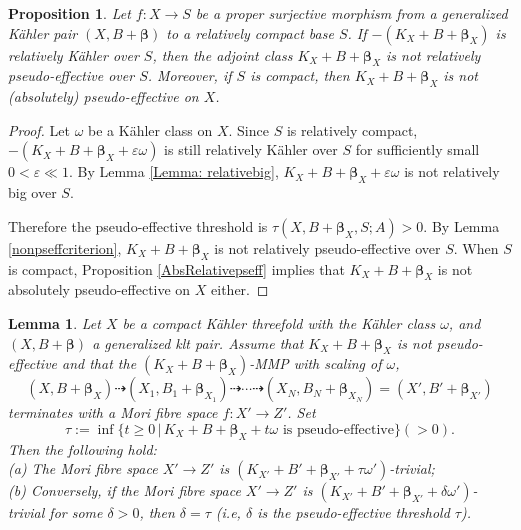 \documentclass[12pt]{amsart}
\numberwithin{equation}{section}
\newtheorem{proposition}[theorem]{Proposition}
\newtheorem{lemma}  [theorem]     {Lemma}
\theoremstyle{definition}
\theoremstyle{plain}
\newtheorem*{thm A*}{Theorem A}
\newtheorem*{thm B*}{Theorem B}
\newtheorem*{thm C*}{Theorem C}
\newtheorem*{thm D*}{Theorem D}
\theoremstyle{definition}
\renewcommand{\1}{\mathds{1}}
\newcommand{\bbeta}{\boldsymbol{\beta}}
\renewcommand{\>}{\rightarrow}
\begin{document}
\begin{proposition}\label{NonPSEFFMFS}
Let $f \colon X \to S$ be a proper surjective morphism from a generalized K\"ahler pair $(X, B+\boldsymbol{\beta})$ to a relatively compact base $S$.  
If $-(K_X+B+\boldsymbol{\beta}_X)$ is relatively K\"ahler over $S$, then the adjoint class
$K_X+B+\boldsymbol{\beta}_X$ is not relatively pseudo-effective over $S$.  
Moreover, if $S$ is compact, then $K_X+B+\boldsymbol{\beta}_X$ is not (absolutely) pseudo-effective on $X$.
\end{proposition}
\begin{proof}
Let $\omega$ be a K\"ahler class on $X$. Since $S$ is relatively compact, 
$-(K_X+B+{{\bbeta}_X}+\varepsilon\omega)$ is still relatively K\"ahler over $S$ for sufficiently small $0<\varepsilon\ll 1$. By Lemma \ref{Lemma: relativebig}, 
$K_X+B+{{\bbeta}_X}+\varepsilon\omega$ is not relatively big over $S$.

Therefore the pseudo-effective threshold is $\tau(X,B+ { \boldsymbol{\beta}_X},S;A)>0$. By Lemma \ref{nonpseffcriterion}, $K_X+B +  { {\bbeta}_X}$ is not relatively pseudo-effective over $S$. When $S$ is compact, Proposition \ref{AbsRelativepseff} implies that $K_X+B+\bbeta_X$ is not absolutely pseudo-effective on $X$ either. 
\end{proof} 
\begin{lemma}\label{Lemma: PSEFandMFS}
Let $X$ be a compact K\"ahler threefold with the K\"ahler class $\omega$, and $(X,B+\bbeta)$ a generalized klt pair. Assume that $K_X+B+\bbeta_X$ is not pseudo-effective and that the $(K_X+B+\bbeta_X)$-MMP with scaling of $\omega$, $$
(X,B+\bbeta_X) \dashrightarrow (X_1,B_1+\bbeta_{X_{1}}) \dashrightarrow  \cdots 
\dashrightarrow (X_N,B_N+\bbeta_{X_{N}}) = (X',B'+\bbeta_{X'})
$$ terminates with a Mori fibre space $f:X' \to Z'$.
Set 
$$
\tau := \inf \bigl\{ t \ge 0 \,\big|\, K_X + B + \bbeta_X + t\omega \text{ is pseudo-effective}\bigr\}(>0).
$$
Then the following hold:\\
(a) The Mori fibre space $X'\to Z'$ is $(K_{X'}+B'+ \bbeta_{X'} + \tau \omega')$-trivial;\\
(b) Conversely, if the Mori fibre space $X'\to Z'$ is $(K_{X'}+B'+ \bbeta_{X'} + \delta \omega')$-trivial for some $\delta>0$, then $\delta = \tau$ (i.e, $\delta$ is the pseudo-effective threshold $\tau$). 
\end{lemma}
\end{document}
